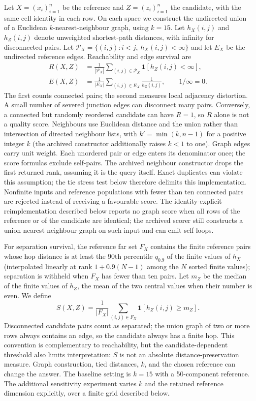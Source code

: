 \documentclass[11pt]{article}
\begin{document}
Let $X=(x_i)_{i=1}^n$ be the reference and $Z=(z_i)_{i=1}^n$ the candidate, with the same cell identity in each row. On each space we construct the undirected union of a Euclidean $k$-nearest-neighbour graph, using $k=15$. Let $h_X(i,j)$ and $h_Z(i,j)$ denote unweighted shortest-path distances, with infinity for disconnected pairs. Let $\mathcal P_X=\{(i,j):i<j,\ h_X(i,j)<\infty\}$ and let $E_X$ be the undirected reference edges. Reachability and edge survival are
\begin{align}
 R(X,Z)&=\frac{1}{|\mathcal P_X|}\sum_{(i,j)\in\mathcal P_X}\mathbf 1[h_Z(i,j)<\infty],\label{eq:reachability}\\
 E(X,Z)&=\frac{1}{|E_X|}\sum_{(i,j)\in E_X}\frac{1}{h_Z(i,j)},\qquad 1/\infty=0.
\end{align}
The first counts connected pairs; the second measures local adjacency distortion. A small number of severed junction edges can disconnect many pairs. Conversely, a connected but randomly reordered candidate can have $R=1$, so $R$ alone is not a quality score. Neighbours use Euclidean distance and the union rather than intersection of directed neighbour lists, with $k'=\min(k,n-1)$ for a positive integer $k$ (the archived constructor additionally raises $k<1$ to one). Graph edges carry unit weight. Each unordered pair or edge enters its denominator once; the score formulas exclude self-pairs. The archived neighbour constructor drops the first returned rank, assuming it is the query itself. Exact duplicates can violate this assumption; the tie stress test below therefore delimits this implementation. Nonfinite inputs and reference populations with fewer than ten connected pairs are rejected instead of receiving a favourable score. The identity-explicit reimplementation described below reports no graph score when all rows of the reference or of the candidate are identical; the archived scorer still constructs a union nearest-neighbour graph on such input and can emit self-loops.

For separation survival, the reference far set $F_X$ contains the finite reference pairs whose hop distance is at least the 90th percentile $q_{0.9}$ of the finite values of $h_X$ (interpolated linearly at rank $1+0.9(N-1)$ among the $N$ sorted finite values); separation is withheld when $F_X$ has fewer than ten pairs. Let $m_Z$ be the median of the finite values of $h_Z$, the mean of the two central values when their number is even. We define
\begin{equation}
 S(X,Z)=\frac{1}{|F_X|}\sum_{(i,j)\in F_X}\mathbf 1[h_Z(i,j)\geq m_Z].
\end{equation}
Disconnected candidate pairs count as separated; the union graph of two or more rows always contains an edge, so the candidate always has a finite hop. This convention is complementary to reachability, but the candidate-dependent threshold also limits interpretation: $S$ is not an absolute distance-preservation measure. Graph construction, tied distances, $k$, and the chosen reference can change the answer. The baseline setting is $k=15$ with a 50-component reference. The additional sensitivity experiment varies $k$ and the retained reference dimension explicitly, over a finite grid described below.
\end{document}
